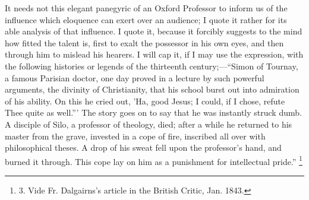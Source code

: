 It needs not this elegant
panegyric of an Oxford Professor to inform us of the influence which
eloquence can exert over an audience; I quote it rather for its able
analysis of that influence. I quote it, because it forcibly suggests
to the mind how fitted the talent is, first to exalt the possessor in
his own eyes, and then through him to mislead his hearers. I will cap
it, if I may use the expression, with the following histories or
legends of the thirteenth century;—``Simon of Tournay, a famous
Parisian doctor, one day proved in a lecture by such powerful
arguments, the divinity of Christianity, that his school burst out
into admiration of his ability. On this he cried out, 'Ha, good Jesus;
I could, if I chose, refute Thee quite as well.''' The story goes on
to say that he was instantly struck dumb. A disciple of Silo, a
professor of theology, died; after a while he returned to his master
from the grave, invested in a cope of fire, inscribed all over with
philosophical theses. A drop of his sweat fell upon the professor's
hand, and burned it through. This cope lay on him as a punishment for
intellectual pride.'' \footnote{3.
Vide Fr. Dalgairns's article in the British Critic, Jan. 1843.}

